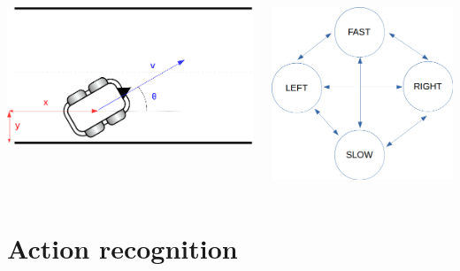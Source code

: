 \documentclass{beamer}
\begin{document}
\begin{frame}
\begin{columns}[c]
\begin{column}{0.5\textwidth}
\centering
\includegraphics[width=.8\linewidth]{coordinates}
\end{column}
\begin{column}{0.5\textwidth}
\flushleft
\includegraphics[width=.5\linewidth]{Automaton}
\end{column}
\end{columns}

\end{frame}

\section{Action recognition}
\end{document}
